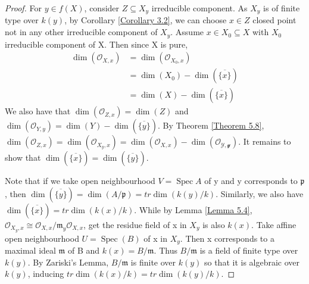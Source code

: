 \documentclass{ctexart}
\newcommand{\spec}{\operatorname{Spec}}
\begin{document}
\begin{proof}
    For $y\in f(X)$, consider $Z \subseteq X_{y}$ irreducible component.
    As $X_{y}$ is of finite type over $k(y)$, by Corollary \ref{Corollary 3.2}, we can choose $x\in Z$ closed point not in any other irreducible component of $X_{y}$.
    Assume $x\in X_{0} \subseteq X$ with $X_{0}$ irreducible component of X.
    Then since X is pure,
    \begin{equation*}
        \begin{split}
            \dim(\mathcal{O}_{X, x}) & = \dim(\mathcal{O}_{X_{0}, x}) \\
            & = \dim(X_{0}) - \dim(\overline{\{x\}}) \\
            & = \dim(X) - \dim(\overline{\{x\}})
        \end{split}
    \end{equation*}
    We also have that $\dim(\mathcal{O}_{Z, x}) = \dim(Z)$ and $\dim(\mathcal{O}_{Y, y}) = \dim(Y) - \dim(\overline{\{y\}})$.
    By Theorem \ref{Theorem 5.8}, $\dim(\mathcal{O}_{Z, x}) = \dim(\mathcal{O}_{X_{y}, x}) = \dim(\mathcal{O}_{X, x}) - \dim(\mathcal{O_{Y, y}})$.
    It remains to show that $\dim(\overline{\{x\}}) = \dim(\overline{\{y\}})$.
    \par
    Note that if we take open neighbourhood $V = \spec A$ of y and y corresponds to $\mathfrak{p}$, then $\dim(\overline{\{y\}}) = \dim(A/\mathfrak{p}) = tr\dim(k(y)/k)$.
    Similarly, we also have $\dim(\overline{\{x\}}) = tr\dim(k(x)/k)$.
    While by Lemma \ref{Lemma 5.4}, $\mathcal{O}_{X_{y}, x} \cong \mathcal{O}_{X, x}/\mathfrak{m}_{y}\mathcal{O}_{X, x}$, get the residue field of x in $X_{y}$ is also $k(x)$.
    Take affine open neighbourhood $U = \spec(B)$ of x in $X_{y}$.
    Then x corresponds to a maximal ideal $\mathfrak{m}$ of B and $k(x) = B/\mathfrak{m}$.
    Thus $B/\mathfrak{m}$ is a field of finite type over $k(y)$.
    By Zariski's Lemma, $B/\mathfrak{m}$ is finite over $k(y)$ so that it is algebraic over $k(y)$, inducing $tr\dim(k(x)/k) = tr\dim(k(y)/k)$.
\end{proof}
\end{document}
